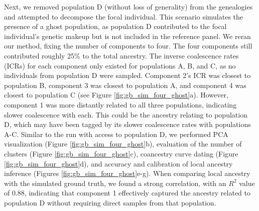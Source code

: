 
Next, we removed population D (without loss of generality) from the genealogies and attempted to decompose the focal individual. This scenario simulates the presence of a ghost population, as population D contributed to the focal individual's genetic makeup but is not included in the reference panel. We reran our method, fixing the number of components to four. The four components still contributed roughly 25\% to the total ancestry. The inverse coalescence rates (ICRs) for each component only existed for populations A, B, and C, as no individuals from population D were sampled. Component 2's ICR was closest to population B, component 3 was closest to population A, and component 4 was closest to population C (see Figure \ref{fig:gb_sim_four_ghost}a). However, component 1 was more distantly related to all three populations, indicating slower coalescence with each. This could be the ancestry relating to population D, which may have been tagged by its slower coalescence rates with populations A-C. Similar to the run with access to population D, we performed PCA visualization (Figure \ref{fig:gb_sim_four_ghost}b), evaluation of the number of clusters (Figure \ref{fig:gb_sim_four_ghost}c), coancestry curve dating (Figure \ref{fig:gb_sim_four_ghost}d), and accuracy and calibration of local ancestry inference (Figures \ref{fig:gb_sim_four_ghost}e-g). When comparing local ancestry with the simulated ground truth, we found a strong correlation, with an $R^2$ value of $0.88$, indicating that component 1 effectively captured the ancestry related to population D without requiring direct samples from that population.

